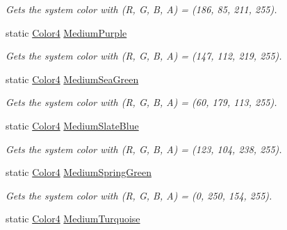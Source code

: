 \begin{DoxyCompactItemize}
\begin{DoxyCompactList}\small\item\em Gets the system color with (R, G, B, A) = (186, 85, 211, 255). \end{DoxyCompactList}\item 
static \hyperlink{struct_open_t_k_1_1_graphics_1_1_color4}{Color4} \hyperlink{struct_open_t_k_1_1_graphics_1_1_color4_a148f0ba059a13682505742c46276b32e}{Medium\-Purple}
\begin{DoxyCompactList}\small\item\em Gets the system color with (R, G, B, A) = (147, 112, 219, 255). \end{DoxyCompactList}\item 
static \hyperlink{struct_open_t_k_1_1_graphics_1_1_color4}{Color4} \hyperlink{struct_open_t_k_1_1_graphics_1_1_color4_af65f53c816790bf1b9b53b4145239b1c}{Medium\-Sea\-Green}
\begin{DoxyCompactList}\small\item\em Gets the system color with (R, G, B, A) = (60, 179, 113, 255). \end{DoxyCompactList}\item 
static \hyperlink{struct_open_t_k_1_1_graphics_1_1_color4}{Color4} \hyperlink{struct_open_t_k_1_1_graphics_1_1_color4_a547d68264734d595876c21e57d8a45c8}{Medium\-Slate\-Blue}
\begin{DoxyCompactList}\small\item\em Gets the system color with (R, G, B, A) = (123, 104, 238, 255). \end{DoxyCompactList}\item 
static \hyperlink{struct_open_t_k_1_1_graphics_1_1_color4}{Color4} \hyperlink{struct_open_t_k_1_1_graphics_1_1_color4_ab6cfad7ee802bbfe7429fae24bb2a818}{Medium\-Spring\-Green}
\begin{DoxyCompactList}\small\item\em Gets the system color with (R, G, B, A) = (0, 250, 154, 255). \end{DoxyCompactList}\item 
static \hyperlink{struct_open_t_k_1_1_graphics_1_1_color4}{Color4} \hyperlink{struct_open_t_k_1_1_graphics_1_1_color4_a47f08c8dc1f88e4edde82a27957427b7}{Medium\-Turquoise}

\end{DoxyCompactItemize}
